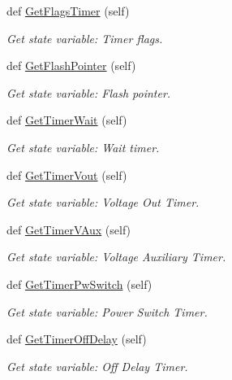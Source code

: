\begin{DoxyCompactItemize}
def \hyperlink{class_mini_box_d_c_d_c_1_1_dc_dc_converter_1_1_dc_dc_converter_a5d9e31e7543c1eecc670a8256be37c3d}{Get\+Flags\+Timer} (self)
\begin{DoxyCompactList}\small\item\em Get state variable\+: Timer flags. \end{DoxyCompactList}\item 
def \hyperlink{class_mini_box_d_c_d_c_1_1_dc_dc_converter_1_1_dc_dc_converter_a08f751dd560392ef3e5cb7802f3f19fb}{Get\+Flash\+Pointer} (self)
\begin{DoxyCompactList}\small\item\em Get state variable\+: Flash pointer. \end{DoxyCompactList}\item 
def \hyperlink{class_mini_box_d_c_d_c_1_1_dc_dc_converter_1_1_dc_dc_converter_a0280ae59f56c09ca95d122d5e982b3ae}{Get\+Timer\+Wait} (self)
\begin{DoxyCompactList}\small\item\em Get state variable\+: Wait timer. \end{DoxyCompactList}\item 
def \hyperlink{class_mini_box_d_c_d_c_1_1_dc_dc_converter_1_1_dc_dc_converter_a303bbe36b05f402030a47cf7836869fa}{Get\+Timer\+Vout} (self)
\begin{DoxyCompactList}\small\item\em Get state variable\+: Voltage Out Timer. \end{DoxyCompactList}\item 
def \hyperlink{class_mini_box_d_c_d_c_1_1_dc_dc_converter_1_1_dc_dc_converter_aaaf98416782292ed3603f8308b9aed38}{Get\+Timer\+V\+Aux} (self)
\begin{DoxyCompactList}\small\item\em Get state variable\+: Voltage Auxiliary Timer. \end{DoxyCompactList}\item 
def \hyperlink{class_mini_box_d_c_d_c_1_1_dc_dc_converter_1_1_dc_dc_converter_a1562693daf77dc071a51d0fecd63131f}{Get\+Timer\+Pw\+Switch} (self)
\begin{DoxyCompactList}\small\item\em Get state variable\+: Power Switch Timer. \end{DoxyCompactList}\item 
def \hyperlink{class_mini_box_d_c_d_c_1_1_dc_dc_converter_1_1_dc_dc_converter_a61f1f2866b03a91566a8501251648ec7}{Get\+Timer\+Off\+Delay} (self)
\begin{DoxyCompactList}\small\item\em Get state variable\+: Off Delay Timer. \end{DoxyCompactList}\item 

\end{DoxyCompactItemize}
